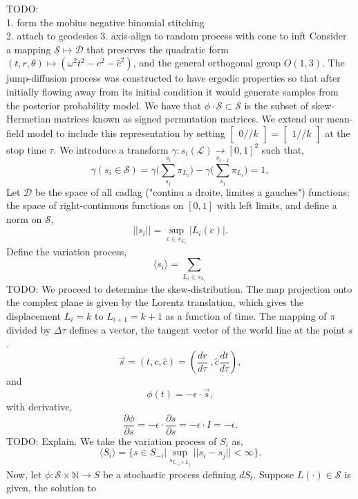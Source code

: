 \documentclass[10pt]{article}
\newcommand{\mcL}{\mathcal{L}}
\newcommand{\mcS}{\mathcal{S}}
\newcommand{\mcD}{\mathcal{D}}
\theoremstyle{definition}
\begin{document}
TODO: \\
1. form the mobius negative binomial stitching\\
2. attach to geodesics
3. axis-align to random process with cone to inft
Consider a mapping $\mcS\mapsto \mcD$ that preserves the quadratic form $(t, r,
\theta)\mapsto (\omega^2 t^2-c^2-\hat c^2)$, and the general orthogonal group $O(1,3)$.
The jump-diffusion process was constructed to have ergodic properties so that
after initially flowing away from its initial condition it would generate
samples from the posterior probability model. We have that $\phi\cdot
\mcS\subset \mcS$ is the subset of skew-Hermetian matrices known as signed
permutation matrices. We extend our mean-field model to include this
representation by setting $\begin{bmatrix}0 // k\end{bmatrix} = \begin{bmatrix}1 //
k\end{bmatrix}$ at the stop time $\tau$.
We introduce a transform 
$\gamma: s_i(\mcL) \rightarrow [0,1]^2$ such that,
$$
    \gamma(s_i \in \mcS) = \gamma\bigg(\displaystyle\sum_{s_1}^{s_i} \pi_{L_i} \bigg)-
    \gamma\bigg(\displaystyle\sum_{s_1}^{s_{i-1}}\pi_{L_i}\bigg) = 1,
$$
Let $\mcD$ be the space of all cadlag ("continu a droite, limites a
gauches") functions; the space of right-continuous functions on $[0,1]$ with left
limits, and define a norm on $\mcS$, 
$$
    \vert\vert s_i \vert\vert = \sup_{c \in s_{\mcL_i}} \vert L_i(c)\vert.
$$
Define the variation process,
$$
    \langle s_i\rangle = \displaystyle\sum_{L_i \in s_{L_i}}
$$
TODO: %
We proceed to determine the skew-distribution.
The map projection onto the complex plane is given by the Lorentz
translation, which gives the displacement $L_{i}=k$ to $L_{i+1}=k+1$ as a
function of time. The mapping of $\pi$ divided by $\Delta \tau$ defines a vector, the tangent vector
of the world line at the point $s$.
$$
    \vec{s} = (t,c,\hat c) = \left( \frac{dr}{d\tau}\;, \hat c \frac{dt}{d\tau}
    \right),
$$
and
$$
    \phi(t) = -\epsilon \cdot \vec s,
$$
with derivative,
$$
    \frac{\partial \phi}{\partial s} = -\epsilon \cdot \frac{\partial s}{\partial
    s} = -\epsilon\cdot I = -\epsilon.
$$
TODO: Explain.
We take the variation process of $S_i$ as, 
$$
    \langle S_i\rangle = \big\lbrace s \in S_{-i} \vert \sup_{s_{L_{-i}\times
    L_j}} \vert\vert s_i- s_j\vert \vert < \infty\big\rbrace.
$$
Now, let $\phi:\mcS\times \mathbb{N} \rightarrow S$ be a stochastic process
defining $dS_t$.
Suppose $L(\cdot)\in \mcS$ is given, the solution to
\end{document}
